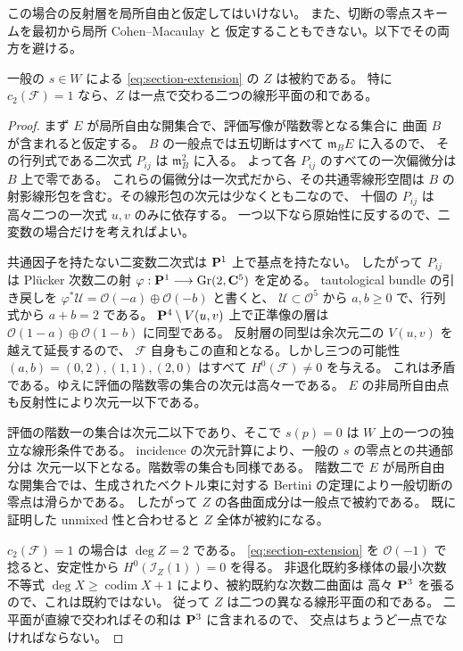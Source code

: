 この場合の反射層を局所自由と仮定してはいけない。
また、切断の零点スキームを最初から局所 Cohen--Macaulay と
仮定することもできない。以下でその両方を避ける。

\begin{lemma}[評価の階数零の集合と被約性]
\label{lem:rank-zero-and-reduced-section}
一般の $s\in W$ による \eqref{eq:section-extension} の $Z$ は被約である。
特に $c_2(\mathcal F)=1$ なら、$Z$ は一点で交わる二つの線形平面の和である。
\end{lemma}

\begin{proof}
まず $E$ が局所自由な開集合で、評価写像が階数零となる集合に
曲面 $B$ が含まれると仮定する。
$B$ の一般点では五切断はすべて $\mathfrak m_B E$ に入るので、
その行列式である二次式 $P_{ij}$ は $\mathfrak m_B^2$ に入る。
よって各 $P_{ij}$ のすべての一次偏微分は $B$ 上で零である。
これらの偏微分は一次式だから、その共通零線形空間は
$B$ の射影線形包を含む。その線形包の次元は少なくとも二なので、
十個の $P_{ij}$ は高々二つの一次式 $u,v$ のみに依存する。
一つ以下なら原始性に反するので、二変数の場合だけを考えればよい。

共通因子を持たない二変数二次式は $\mathbf P^1$ 上で基点を持たない。
したがって $P_{ij}$ は Pl\"ucker 次数二の射
$\varphi:\mathbf P^1\longrightarrow\operatorname{Gr}(2,\mathbf C^5)$ を定める。
tautological bundle の引き戻しを
$\varphi^*\mathcal U=\mathcal O(-a)\oplus\mathcal O(-b)$ と書くと、
$\mathcal U\subset\mathcal O^5$ から $a,b\geq0$ で、行列式から $a+b=2$ である。
$\mathbf P^4\setminus V(u,v)$ 上で正準像の層は
$\mathcal O(1-a)\oplus\mathcal O(1-b)$ に同型である。
反射層の同型は余次元二の $V(u,v)$ を越えて延長するので、
$\mathcal F$ 自身もこの直和となる。しかし三つの可能性
$(a,b)=(0,2),(1,1),(2,0)$ はすべて $H^0(\mathcal F)\neq0$ を与える。
これは矛盾である。ゆえに評価の階数零の集合の次元は高々一である。
$E$ の非局所自由点も反射性により次元一以下である。

評価の階数一の集合は次元二以下であり、そこで $s(p)=0$ は
$W$ 上の一つの独立な線形条件である。
incidence の次元計算により、一般の $s$ の零点との共通部分は
次元一以下となる。階数零の集合も同様である。
階数二で $E$ が局所自由な開集合では、生成されたベクトル束に対する
Bertini の定理により一般切断の零点は滑らかである。
したがって $Z$ の各曲面成分は一般点で被約である。
既に証明した unmixed 性と合わせると $Z$ 全体が被約になる。

$c_2(\mathcal F)=1$ の場合は $\deg Z=2$ である。
\eqref{eq:section-extension} を $\mathcal O(-1)$ で捻ると、安定性から
$H^0(\mathcal I_Z(1))=0$ を得る。
非退化既約多様体の最小次数不等式
$\deg X\geq\operatorname{codim}X+1$ により、被約既約な次数二曲面は
高々 $\mathbf P^3$ を張るので、これは既約ではない。
従って $Z$ は二つの異なる線形平面の和である。
二平面が直線で交わればその和は $\mathbf P^3$ に含まれるので、
交点はちょうど一点でなければならない。
\end{proof}

